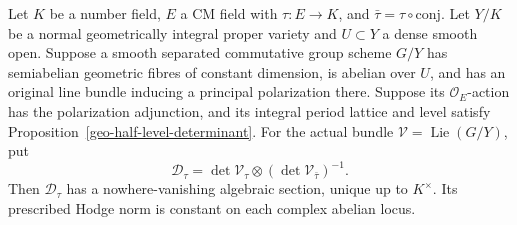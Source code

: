 \begin{theorem}\label{geo-flat-family-generator}
Let $K$ be a number field, $E$ a CM field with
$\tau:E\to K$, and $\bar\tau=\tau\circ\mathrm{conj}$.
Let $Y/K$ be a normal geometrically integral proper variety and
$U\subset Y$ a dense smooth open. Suppose a smooth separated
commutative group scheme $G/Y$ has semiabelian geometric fibres
of constant dimension, is abelian over $U$, and has an original
line bundle inducing a principal polarization there.
Suppose its $\mathcal O_E$-action has the polarization
adjunction, and its integral period lattice and level satisfy
Proposition~\ref{geo-half-level-determinant}.
For the actual bundle $\mathcal V=\operatorname{Lie}(G/Y)$, put
\[
              \mathcal D_\tau=
              \det\mathcal V_\tau\otimes
                    (\det\mathcal V_{\bar\tau})^{-1}.
\]
Then $\mathcal D_\tau$ has a nowhere-vanishing algebraic
section, unique up to $K^\times$. Its prescribed Hodge norm is
constant on each complex abelian locus.
\end{theorem}
